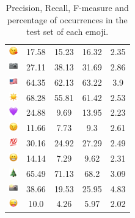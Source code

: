 \documentclass{article}
\begin{document}
\begin{table}
\begin{tabular}{|c|ccc|c|}
\includegraphics[height=0.37cm,width=0.37cm]{img/face_blowing_a_kiss.png} & 17.58 & 15.23 & 16.32 & 2.35\\ 
\includegraphics[height=0.37cm,width=0.37cm]{img/camera.png} & 27.11 & 38.13 & 31.69 & 2.86\\ 
\includegraphics[height=0.37cm,width=0.37cm]{img/United_States.png} & 64.35 & 62.13 & 63.22 & 3.9\\ 
\includegraphics[height=0.37cm,width=0.37cm]{img/sun.png} & 68.28 & 55.81 & 61.42 & 2.53\\ 
\includegraphics[height=0.37cm,width=0.37cm]{img/purple_heart.png} & 24.88 & 9.69 & 13.95 & 2.23\\ 
\includegraphics[height=0.37cm,width=0.37cm]{img/winking_face.png} & 11.66 & 7.73 & 9.3 & 2.61\\ 
\includegraphics[height=0.37cm,width=0.37cm]{img/hundred_points.png} & 30.16 & 24.92 & 27.29 & 2.49\\ 
\includegraphics[height=0.37cm,width=0.37cm]{img/beaming_face_with_smiling_eyes.png} & 14.14 & 7.29 & 9.62 & 2.31\\ 
\includegraphics[height=0.37cm,width=0.37cm]{img/Christmas_tree.png} & 65.49 & 71.13 & 68.2 & 3.09\\ 
\includegraphics[height=0.37cm,width=0.37cm]{img/camera_with_flash.png} & 38.66 & 19.53 & 25.95 & 4.83\\ 
\includegraphics[height=0.37cm,width=0.37cm]{img/winking_face_with_tongue.png} & 10.0 & 4.26 & 5.97 & 2.02\\ 

\hline
\end{tabular}
\caption{\label{table:emoji_detailed} Precision, Recall, F-measure and percentage of occurrences in the test set of each emoji.}
\end{table}
\end{document}

